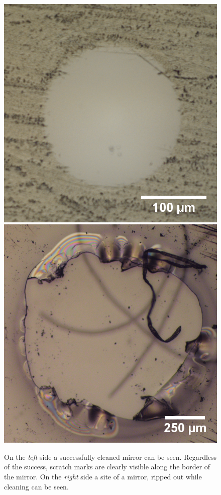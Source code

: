 \begin{figure}[H]
	\includegraphics[scale=0.25]{source/cleaning_good_scale}
	\includegraphics[scale=0.25]{source/cleaning_bad_scale}
	\caption{On the \textit{left} side a successfully cleaned mirror can be seen. Regardless of the success, scratch marks are clearly visible along the border of the mirror. On the \textit{right} side a site of a mirror, ripped out while cleaning can be seen.}
\end{figure}